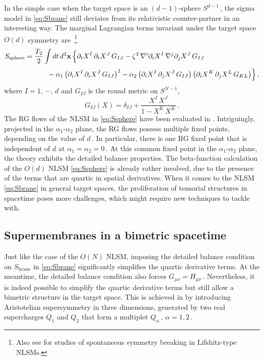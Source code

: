 \documentclass[11pt]{article}
\newcommand{\be}{\begin{equation}}
\newcommand{\ee}{\end{equation}}
\newcommand{\p}{\partial}
\begin{document}
In the simple case when the target space is an $(d-1)$-sphere $S^{d-1}$\,, the sigma model in \eqref{eq:Sbrane} still deviates from its relativistic counter-partner in an interesting way. The marginal Lagrangian terms invariant under the target space $O(d)$ symmetry are \cite{Anagnostopoulos:2010gw, lnlsm, Yan:2017mse}\,\footnote{Also see \cite{Griffin:2013dfa} for studies of spontaneous symmetry breaking in Lifshitz-type NLSMs.}
%
\begin{align} \label{eq:Ssphere}
\begin{split}
	S_\text{sphere} & = \frac{T_2}{2} \int dt \, d^2 \mathbf{x} \, \Bigl\{ \p_t X^I \, \p_t X^J \, G_{IJ} - \zeta^2 \, \nabla^i \p_i X^I \, \nabla^j \p_j X^J \, G_{IJ} \\[2pt]
	& \qquad\quad\, -  \alpha_1 \, \bigl( \p_i X^I \, \p_i X^J \, G_{IJ} \bigr)^2 - \alpha_2 \, \bigl( \p_i X^I \, \p_j X^J \, G_{IJ} \bigr) \, \bigl( \p_i X^K \, \p_j X^L \, G_{KL} \bigr)  \Bigr\}\,,
\end{split}
\end{align}
%
where $I = 1, \, \cdots, \, d$ and $G_{IJ}$ is the round metric on $S^{N-1}$, 
%
\be
	G_{IJ} (X) = \delta_{IJ} + \frac{X^I \, X^J}{1 - X^K \, X^K}\,.
\ee
%
The RG flows of the NLSM in \eqref{eq:Ssphere} have been evaluated in \cite{lnlsm, Yan:2017mse}. Intriguingly, projected in the $\alpha_1$-$\alpha_2$ plane, the RG flows possess multiple fixed points, depending on the value of $d$\,. In particular, there is one RG fixed point that is independent of $d$ at $\alpha_1 = \alpha_2 = 0$\,. At this common fixed point in the $\alpha_1$-$\alpha_2$ plane, the theory exhibits  the detailed balance properties. The beta-function calculation of the $O(d)$ NLSM \eqref{eq:Ssphere} is already rather involved, due to the presence of the terms that are quartic in spatial derivatives. When it comes to the NLSM \eqref{eq:Sbrane} in general target spaces, the proliferation of tensorial structures in spacetime poses more challenges, which might require new techniques to tackle with.

\subsection{Supermembranes in a bimetric spacetime}

Just like the case of the $O(N)$ NLSM, imposing the detailed balance condition on $S_\text{brane}$ in \eqref{eq:Sbrane} significantly simplifies the quartic derivative terms. At the meantime, the detailed balance condition also forces $G_{\mu\nu} = H_{\mu\nu}$\,. Nevertheless, it is indeed possible to simplify the quartic derivative terms but still allow a bimetric structure in the target space. This is achieved in \cite{ssl, as} by introducing Aristotelian supersymmetry in three dimensions, generated by two real supercharges $Q_1$ and $Q_2$ that form a multiplet $Q_\alpha$\,, $\alpha = 1, 2$\,. 
\end{document}

